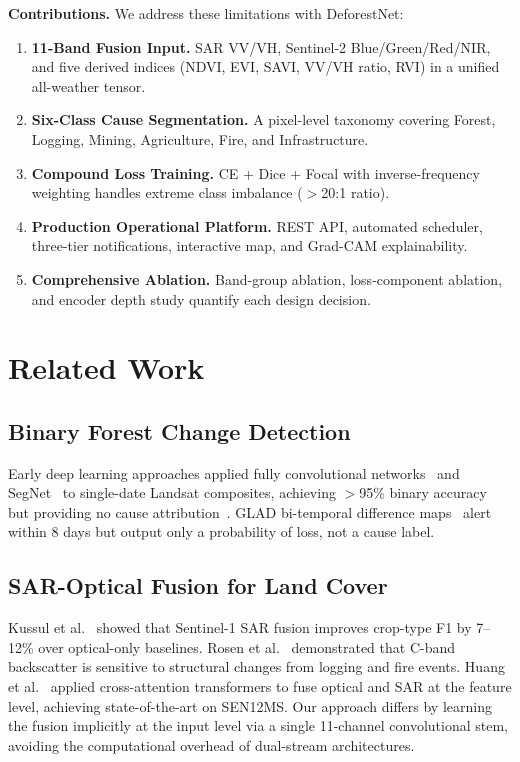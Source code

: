 \documentclass[10pt,conference]{IEEEtran}
\begin{document}
\textbf{Contributions.} We address these limitations with DeforestNet:

\begin{enumerate}[leftmargin=*,topsep=2pt,itemsep=1pt]
  \item \textbf{11-Band Fusion Input.} SAR VV/VH, Sentinel-2 Blue/Green/Red/NIR,
        and five derived indices (NDVI, EVI, SAVI, VV/VH ratio, RVI) in a
        unified all-weather tensor.
  \item \textbf{Six-Class Cause Segmentation.} A pixel-level taxonomy covering
        Forest, Logging, Mining, Agriculture, Fire, and Infrastructure.
  \item \textbf{Compound Loss Training.} CE + Dice + Focal with inverse-frequency
        weighting handles extreme class imbalance ($>$20:1 ratio).
  \item \textbf{Production Operational Platform.} REST API, automated scheduler,
        three-tier notifications, interactive map, and Grad-CAM explainability.
  \item \textbf{Comprehensive Ablation.} Band-group ablation, loss-component
        ablation, and encoder depth study quantify each design decision.
\end{enumerate}

\section{Related Work}
\label{sec:related}

\subsection{Binary Forest Change Detection}
Early deep learning approaches applied fully convolutional
networks~\cite{long2015fully} and SegNet~\cite{badrinarayanan2017segnet} to
single-date Landsat composites, achieving $>$95\% binary accuracy but providing
no cause attribution~\cite{torres2021deforestation}. GLAD bi-temporal
difference maps~\cite{glad} alert within 8 days but output only a probability
of loss, not a cause label.

\subsection{SAR-Optical Fusion for Land Cover}
Kussul et al.~\cite{kussul2017deep} showed that Sentinel-1 SAR fusion improves
crop-type F1 by 7--12\% over optical-only baselines. Rosen et
al.~\cite{rosen2021measuring} demonstrated that C-band backscatter is sensitive
to structural changes from logging and fire events. Huang et
al.~\cite{huang2022multimodal} applied cross-attention transformers to fuse
optical and SAR at the feature level, achieving state-of-the-art on SEN12MS.
Our approach differs by learning the fusion implicitly at the input level via a
single 11-channel convolutional stem, avoiding the computational overhead of
dual-stream architectures.
\end{document}
